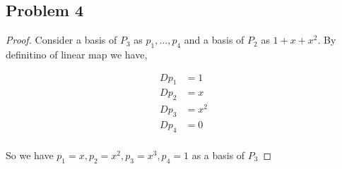 \documentclass[a4paper]{report}
\begin{document}
\subsection*{Problem 4}
\begin{proof}
    Consider a basis of $P_3$ as $p_1,\dots,p_4$ and a basis of $P_2$ as $1 + x + x^2$. By definitino of linear map we have, 

    \begin{align*}
        Dp_1 &= 1 \\
        Dp_2 &= x\\
        Dp_3 &= x^2\\
        Dp_4 &= 0 \\
    \end{align*}

    So we have $p_1 = x, p_2 = x^2, p_3 = x^{3}, p_4 = 1$ as a basis of $P_3$


\end{proof}
\end{document}
